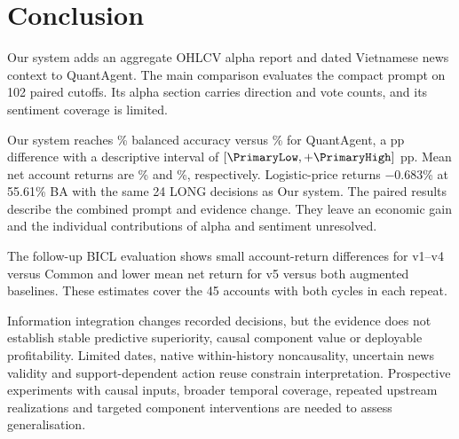 \section{Conclusion}
\label{sec:conclusion}

Our system adds an aggregate OHLCV alpha report and dated Vietnamese news
context to QuantAgent. The main comparison evaluates the compact prompt
on 102 paired cutoffs. Its alpha section carries direction and vote
counts, and its sentiment coverage is limited.

Our system reaches \FullBA\% balanced accuracy versus \BaseBA\% for
QuantAgent, a \DeltaBA{} pp difference with a descriptive
interval of $[\PrimaryLow,+\PrimaryHigh]$ pp. Mean net account returns
are \FullReturn\% and \BaseReturn\%, respectively. Logistic-price returns
$-0.683$\% at 55.61\% BA with the same 24 LONG decisions as Our system.
The paired results describe the combined prompt and evidence change.
They leave an economic gain and the individual contributions of alpha
and sentiment unresolved.

The follow-up BICL evaluation shows small account-return differences for
v1--v4 versus Common and lower mean net return for v5 versus both
augmented baselines. These estimates cover the 45 accounts with both
cycles in each repeat.


Information integration changes recorded decisions, but the evidence does not establish stable predictive superiority, causal component value or deployable profitability. Limited dates, native within-history noncausality, uncertain news validity and support-dependent action reuse constrain interpretation. Prospective experiments with causal inputs, broader temporal coverage, repeated upstream realizations and targeted component interventions are needed to assess generalisation.
